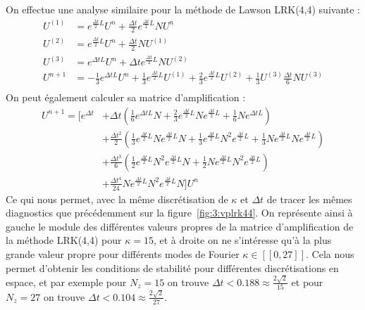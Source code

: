 On effectue une analyse similaire pour la méthode de Lawson LRK(4,4) suivante :
$$
  \begin{aligned}
    U^{(1)} &= e^{\frac{\Delta t}{2}L}U^n + \frac{\Delta t}{2}e^{\frac{\Delta t}{2}L}NU^n \\
    U^{(2)} &= e^{\frac{\Delta t}{2}L}U^n + \frac{\Delta t}{2}NU^{(1)} \\
    U^{(3)} &= e^{\Delta tL}U^n + \Delta te^{\frac{\Delta t}{2}L}NU^{(2)} \\
    U^{n+1} &= -\frac{1}{3}e^{\Delta tL}U^n + \frac{1}{3}e^{\frac{\Delta t}{2}L}U^{(1)} + \frac{2}{3}e^{\frac{\Delta t}{2}L}U^{(2)} + \frac{1}{3}U^{(3)} \frac{\Delta t}{6}NU^{(3)} \\
  \end{aligned}
$$
On peut également calculer sa matrice d'amplification :
$$
  \begin{aligned}
    U^{n+1} = \Big[ e^{\Delta t} 
              & + \Delta t\left( \frac{1}{6}e^{\Delta t L}N + \frac{2}{3}e^{\frac{\Delta t}{2}L}Ne^{\frac{\Delta t}{2}L} + \frac{1}{6}Ne^{\Delta t L} \right) \\
              & + \frac{\Delta t^2}{2} \left( \frac{1}{3}e^{\frac{\Delta t}{2}L}Ne^{\frac{\Delta t}{2}L}N + \frac{1}{3}e^{\frac{\Delta t}{2}L}N^2e^{\frac{\Delta t}{2}L} + \frac{1}{3}Ne^{\frac{\Delta t}{2}L}Ne^{\frac{\Delta t}{2}L} \right) \\
              & + \frac{\Delta t^3}{6} \left( \frac{1}{2}e^{\frac{\Delta t}{2}L}N^2e^{\frac{\Delta t}{2}L}N + \frac{1}{2}Ne^{\frac{\Delta t}{2}L}N^2e^{\frac{\Delta t}{2}L} \right) \\
              & + \frac{\Delta t^4}{24}Ne^{\frac{\Delta t}{2}L}N^2e^{\frac{\Delta t}{2}L}N \Big]U^n
  \end{aligned}
$$
Ce qui nous permet, avec la même discrétisation de $\kappa$ et $\Delta t$ de tracer les mêmes diagnostics que précédemment sur la figure~\ref{fig:3:vplrk44}. On représente ainsi à gauche le module des différentes valeurs propres de la matrice d'amplification de la méthode LRK(4,4) pour $\kappa=15$, et à droite on ne s'intéresse qu'à la plus grande valeur propre pour différents modes de Fourier $\kappa\in[\![0,27]\!]$. Cela nous permet d'obtenir les conditions de stabilité pour différentes discrétisations en espace, et par exemple pour $N_z = 15$ on trouve $\Delta t<0.188 \approx \frac{2\sqrt{2}}{15}$ et pour $N_z = 27$ on trouve $\Delta t < 0.104 \approx \frac{2\sqrt{2}}{27}$.
